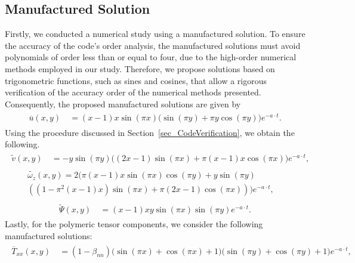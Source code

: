 \documentclass[preprint, 12pt]{elsarticle}
\begin{document}
\subsection{Manufactured Solution}

Firstly, we conducted a numerical study using a manufactured solution. To ensure the accuracy of the code's order analysis, the manufactured solutions must avoid polynomials of order less than or equal to four, due to the high-order numerical methods employed in our study. Therefore, we propose solutions based on trigonometric functions, such as sines and cosines, that allow a rigorous verification of the accuracy order of the numerical methods presented. Consequently, the proposed manufactured solutions are given by
\begin{gather}
    \begin{aligned}
        \overline{u}(x,y) &~= (x-1) x \sin(\pi x) \bigg(\sin(\pi y)+\pi y \cos(\pi y)\bigg) e^{-a\cdot t}.\label{eq:u_case0_2}
    \end{aligned}
\end{gather}
Using the procedure discussed in Section~\ref{sec_CodeVerification}, we obtain the following.
\begin{gather}
    \begin{aligned}
        \widetilde{v}(x,y) &~= -y\sin(\pi y)\bigg((2x-1)\sin(\pi x)+\pi(x-1)x\cos(\pi x)\bigg)e^{-a\cdot t},\label{eq:v_case0_2}
    \end{aligned}
\end{gather}
\begin{gather}
    \begin{aligned}
        \widetilde{\omega_{z}}(x,y) = 2\bigg(\pi(x-1)x\sin(\pi x)\cos(\pi y)+y\sin(\pi y) &~ \\ \left(\left(1-\pi^2(x-1)x\right)\sin(\pi x)+\pi(2x - 1)\cos(\pi x)\right)\bigg)e^{-a\cdot t},\label{eq:wz_case0_2}
    \end{aligned}
\end{gather}
\begin{gather}
    \begin{aligned}
        \widetilde{\Psi}(x,y) &~= (x-1) x y\sin(\pi x)\sin(\pi y) e^{-a\cdot t}.\label{eq:psi_case0_2}
    \end{aligned}
\end{gather}
Lastly, for the polymeric tensor components, we consider the following manufactured solutions:
\begin{gather}
    \begin{aligned}
        \overline{T}_{xx}(x,y) &~= (1-\beta_{nn})\bigg(\sin(\pi x)+\cos(\pi x)+1\bigg)\bigg(\sin(\pi  y)+\cos (\pi y)+1\bigg)e^{-a\cdot t},\label{eq:txx_case0_2}
    \end{aligned}
\end{gather}
\end{document}
